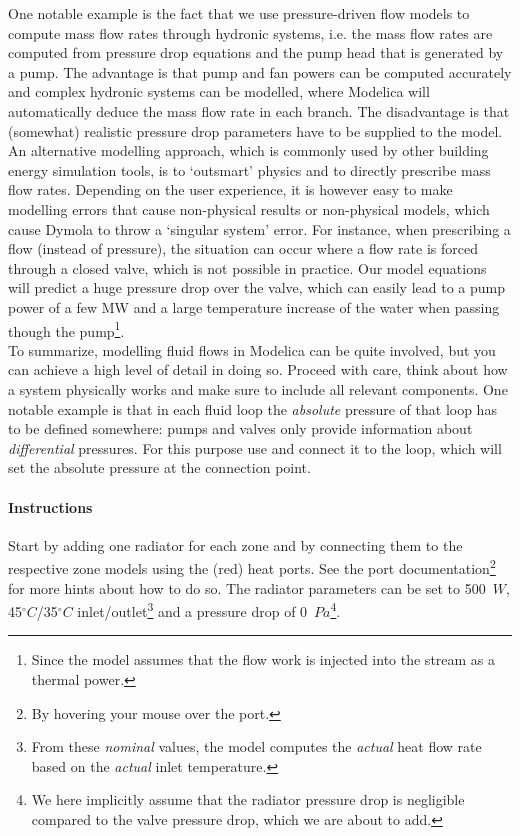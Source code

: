 \documentclass[10pt,a4paper]{article}
\begin{document}
One notable example is the fact that we use pressure-driven flow models 
to compute mass flow rates through hydronic systems, i.e. the mass flow rates are computed from pressure drop equations
and the pump head that is generated by a pump.
The advantage is that 
pump and fan powers can be computed accurately and 
complex hydronic systems can be modelled, 
where Modelica will automatically deduce the mass flow rate in each branch.
The disadvantage is that (somewhat) realistic pressure drop parameters have to be supplied
to the model.
An alternative modelling approach, which is commonly used by other building energy simulation tools, 
is to `outsmart' physics and to directly prescribe mass flow rates.
Depending on the user experience, it is however easy to make modelling errors that cause
non-physical results or non-physical models, which cause Dymola to throw a `singular system' error.
For instance, when prescribing a flow (instead of pressure),
the situation can occur where a flow rate is forced
through a closed valve, which is not possible in practice. 
Our model equations will predict a huge
pressure drop over the valve, which can easily lead to a pump power 
of a few MW and a large
temperature increase of the water when passing though the pump\footnote{Since the model assumes that the flow work 
is injected into the stream as a thermal power.}.\\

To summarize, modelling fluid flows in Modelica can be quite involved,
but you can achieve a high level of detail in doing so.
Proceed with care, think about how a system physically works and make sure to 
include all relevant components.
One notable example is that in each fluid loop the 
\textit{absolute} pressure of that loop has to be defined somewhere: 
pumps and valves only provide information
about \textit{differential} pressures. 
For this purpose use  and connect
it to the loop, which will set the absolute pressure at the connection point.

\newpage

\paragraph{Instructions}
Start by adding one radiator for each zone and by 
connecting them to the respective zone models using the (red) heat ports.
See the port documentation\footnote{By hovering your mouse over the port.} 
for more hints about how to do so.
The radiator parameters can be set to 500~$W$, 45$^{\circ}C$/35$^{\circ}C$ inlet/outlet\footnote{From these \textit{nominal} values, the model computes the \textit{actual} heat flow rate based on the \textit{actual} inlet temperature.}
and a pressure drop of 0~$Pa$\footnote{We here implicitly assume that the radiator pressure drop is negligible compared to the valve pressure drop, which we are about to add.}.\\
\end{document}
